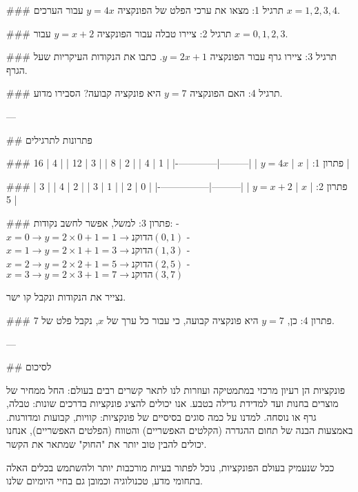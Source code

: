### תרגיל 1:
מצאו את ערכי הפלט של הפונקציה $y = 4x$ עבור הערכים $x = 1, 2, 3, 4$.

### תרגיל 2:
ציירו טבלה עבור הפונקציה $y = x + 2$ עבור $x = 0, 1, 2, 3$.

### תרגיל 3:
ציירו גרף עבור הפונקציה $y = 2x + 1$. כתבו את הנקודות העיקריות שעל הגרף.

### תרגיל 4:
האם הפונקציה $y = 7$ היא פונקציה קבועה? הסבירו מדוע.

---

## פתרונות לתרגילים

### פתרון 1:
| $x$ | $y = 4x$ |
|---------|-------------|
| 1       | 4           |
| 2       | 8           |
| 3       | 12          |
| 4       | 16          |

### פתרון 2:
| $x$ | $y = x + 2$ |
|---------|----------------|
| 0       | 2              |
| 1       | 3              |
| 2       | 4              |
| 3       | 5              |

### פתרון 3:
למשל, אפשר לחשב נקודות:
- $x = 0 \rightarrow y = 2 \times 0 + 1 = 1  \rightarrow  נקודה (0, 1)$
- $x = 1 \rightarrow y = 2 \times 1 + 1 = 3  \rightarrow  נקודה (1, 3)$
- $x = 2 \rightarrow y = 2 \times 2 + 1 = 5  \rightarrow  נקודה (2, 5)$
- $x = 3 \rightarrow y = 2 \times 3 + 1 = 7  \rightarrow  נקודה (3, 7)$

נצייר את הנקודות ונקבל קו ישר.

### פתרון 4:
כן, $y = 7$ היא פונקציה קבועה, כי עבור כל ערך של $x$, נקבל פלט של 7.

---

## לסיכום

פונקציות הן רעיון מרכזי במתמטיקה ועוזרות לנו לתאר קשרים רבים בעולם: החל ממחיר של מוצרים בחנות ועד למדידת גדילה בטבע. 
אנו יכולים להציג פונקציות בדרכים שונות: טבלה, גרף או נוסחה. 
למדנו על כמה סוגים בסיסיים של פונקציות: קוויות, קבועות ומדורגות. 
באמצעות הבנה של תחום ההגדרה (הקלטים האפשריים) והטווח (הפלטים האפשריים), אנחנו יכולים להבין טוב יותר את "החוק" שמתאר את הקשר.

ככל שנעמיק בעולם הפונקציות, נוכל לפתור בעיות מורכבות יותר ולהשתמש בכלים האלה בתחומי מדע, טכנולוגיה וכמובן גם בחיי היומיום שלנו.
